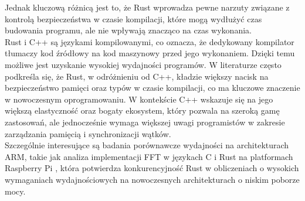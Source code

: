 Jednak kluczową różnicą jest to, że Rust wprowadza pewne narzuty związane z kontrolą bezpieczeństwa w czasie kompilacji, które mogą wydłużyć czas budowania programu, ale nie wpływają znacząco na czas wykonania.\\
Rust i C++ są językami kompilowanymi, co oznacza, że dedykowany kompilator tłumaczy kod źródłowy na kod maszynowy przed jego wykonaniem. Dzięki temu możliwe jest uzyskanie wysokiej wydajności programów. W literaturze \cite{Lesiński} często podkreśla się, że Rust, w odróżnieniu od C++, kładzie większy nacisk na bezpieczeństwo pamięci oraz typów w czasie kompilacji, co ma kluczowe znaczenie w nowoczesnym oprogramowaniu. W kontekście C++ wskazuje się na jego większą elastyczność oraz bogaty ekosystem, który pozwala na szeroką gamę zastosowań, ale jednocześnie wymaga większej uwagi programistów w zakresie zarządzania pamięcią i synchronizacji wątków.\\
Szczególnie interesujące są badania porównawcze wydajności na architekturach ARM, takie jak analiza implementacji FFT w językach C i Rust na platformach Raspberry Pi \cite{FFTPerformance}, która potwierdza konkurencyjność Rust w obliczeniach o wysokich wymaganiach wydajnościowych na nowoczesnych architekturach o niskim poborze mocy.
